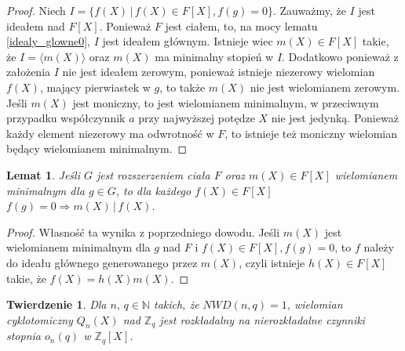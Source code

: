 \documentclass[polish,declaration,shortabstract]{iithesis}
\theoremstyle{definition}
\theoremstyle{remark} \newtheorem{observation}{Obserwacja}
\theoremstyle{plain} \newtheorem{theorem}{Twierdzenie}
\theoremstyle{plain} \newtheorem{lemma}{Lemat}
\theoremstyle{remark} \newtheorem*{remark*}{Uwaga}
\theoremstyle{reminder} \newtheorem*{reminder*}{Przypomnienie}
\begin{document}
	
\begin{proof}
	Niech $I = \{f(X) \, | \, f(X) \in F[X], f(g) = 0\}$. Zauważmy, że $I$ jest ideałem nad $F[X]$. Ponieważ $F$ jest ciałem, to, na mocy lematu \ref{idealy_glowne0}, $I$ jest ideałem głównym. Istnieje wiec $m(X) \in F[X]$ takie, że $I = \langle m(X) \rangle$ oraz $m(X)$ ma minimalny stopień w $I$. Dodatkowo ponieważ z założenia $I$ nie jest ideałem zerowym, ponieważ istnieje niezerowy wielomian $f(X)$, mający pierwiastek w $g$, to także $m(X)$ nie jest wielomianem zerowym. Jeśli $m(X)$ jest moniczny, to jest wielomianem minimalnym, w przeciwnym przypadku współczynnik $a$ przy najwyższej potędze $X$ nie jest jedynką. Ponieważ każdy element niezerowy ma odwrotność w $F$, to istnieje też moniczny wielomian będący wielomianem minimalnym.
\end{proof}
	
\begin{lemma}
	Jeśli $G$ jest rozszerzeniem ciała $F$ oraz $m(X) \in F[X]$ wielomianem minimalnym dla $g \in G$, to dla każdego $f(X) \in F[X]$ $f(g) = 0 \Rightarrow m(X) \, | \, f(X)$.
\end{lemma}
	
\begin{proof}
	Własność ta wynika z poprzedniego dowodu. Jeśli $m(X)$ jest wielomianem minimalnym dla $g$ nad $F$ i $f(X) \in F[X], f(g) = 0$, to $f$ należy do ideału głównego generowanego przez $m(X)$, czyli istnieje $h(X) \in F[X]$ takie, że $f(X) = h(X)m(X)$.
\end{proof}
	
\begin{theorem} \label{kluczowe}
	Dla $n, \, q \in \mathbb{N}$ takich, że $NWD(n, q) = 1$, wielomian cyklotomiczny $Q_n(X)$ nad $\mathbb{Z}_q$ jest rozkładalny na nierozkładalne czynniki stopnia $o_n(q)$ w $\mathbb{Z}_q[X]$.
\end{theorem}
	
\end{document}
